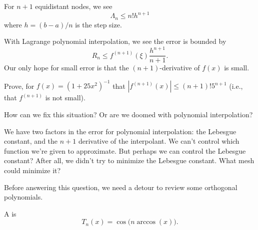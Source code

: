 \begin{ex}
  For $n+1$ equidistant nodes, we see
  \begin{equation}
    \Lambda_{n}\leq n! h^{n+1}
  \end{equation}
  where $h=(b-a)/n$ is the step size. 
\end{ex}

\begin{rmk}
  With Lagrange polynomial interpolation, we see the error is bounded by
  \begin{equation}
    R_{n}\leq f^{(n+1)}(\xi)\frac{h^{n+1}}{n+1}.
  \end{equation}
  Our only hope for small error is that the $(n+1)$-derivative of $f(x)$
  is small.
\end{rmk}

\begin{xca}
  Prove, for $f(x) = (1 + 25 x^{2})^{-1}$ that $|f^{(n+1)}(x)|\leq (n+1)!5^{n+1}$
  (i.e., that $f^{(n+1)}$ is not small).
\end{xca}

\begin{puzzle}
  How can we fix this situation? Or are we doomed with polynomial
  interpolation?
\end{puzzle}

We have two factors in the error for polynomial interpolation: the
Lebesgue constant, and the $n+1$ derivative of the interpolant. We can't
control which function we're given to approximate. But perhaps we can
control the Lebesgue constant? After all, we didn't try to minimize the
Lebesgue constant. What mesh could minimize it?

Before answering this question, we need a detour to review some
orthogonal polynomials.

\begin{defn}
  A  is
  \begin{equation}
    T_{n}(x) = \cos\bigl(n\arccos(x)\bigr).
  \end{equation}
\end{defn}

